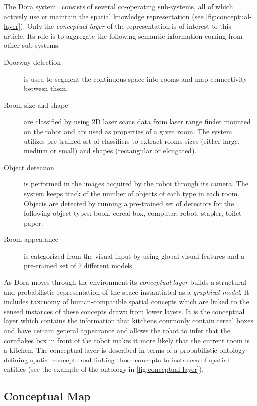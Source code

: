 \documentclass[runningheads,a4paper]{llncs}
\begin{document}
The Dora system~\cite{ijcai} consists of several co-operating sub-systems,
all of which actively use or maintain the spatial knowledge representation
(see \autoref{fig:conceptual-layer}).
Only the \emph{conceptual layer} of the representation is of interest to this article.
Its role is to aggregate the following semantic information coming from other sub-systems:
\begin{description}
 \item[Doorway detection] is used to segment the continuous space into rooms and map connectivity between them.
 \item[Room size and shape] are classified by using 2D laser scans data from laser range finder mounted on the robot and are used as properties of a given room. The system utilizes pre-trained set of classifiers to extract rooms sizes (either large, medium or small) and shapes (rectangular or elongated).
 \item[Object detection] is performed in the images acquired by the robot through its camera. The system keeps track of the number of objects of each type in each room. Objects are detected by running a pre-trained set of detectors for the following object types: book, cereal box, computer, robot, stapler, toilet paper.
 \item[Room appearance] is categorized from the visual input by using global visual features and a pre-trained set of 7 different models.
\end{description}

As Dora moves through the environment its \emph{conceptual layer} builds a structural and
probabilistic representation of the space instantiated as a \emph{graphical model}.
It includes taxonomy of human-compatible spatial concepts which are linked to the sensed 
instances of these concepts drawn from lower layers. It is the conceptual layer which 
contains the information that kitchens commonly contain cereal boxes and have certain 
general appearance and allows the robot to infer that the cornflakes box in front of the 
robot makes it more likely that the current room is a kitchen. The conceptual layer is 
described in terms of a probabilistic ontology defining spatial concepts and linking 
those concepts to instances of spatial entities (see the example of the ontology in
\autoref{fig:conceptual-layer}).

\subsection{Conceptual Map}
\end{document}

